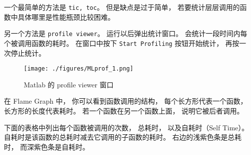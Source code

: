 
\begin{issues}
\issueDraft
\end{issues}


一个最简单的方法是 \verb|tic, toc|。 但是缺点是过于简单， 若要统计层层调用的函数中具体哪里是性能瓶颈比较困难。

另一个方法是 \verb|profile viewer|。 运行以后弹出统计窗口。 会统计一段时间内每个被调用函数的耗时。 在窗口中按下 \verb|Start Profiling| 按钮开始统计， 再按一次停止统计。

\begin{figure}[ht]
\centering
\texttt{[image: ./figures/MLprof\_1.png]}
\caption{Matlab 的 profile viewer 窗口} \label{MLprof_fig1}
\end{figure}

在 Flame Graph 中， 你可以看到函数调用的结构， 每个长方形代表一个函数， 长方形的长度代表耗时。 若一个函数在另一个函数上面， 说明它被后者调用。

下面的表格中列出每个函数被调用的次数， 总耗时， 以及自耗时（Self Time）。 自耗时是该函数的总耗时减去它调用的子函数的耗时。 右边的浅紫色条是总耗时， 而深紫色条是自耗时。
